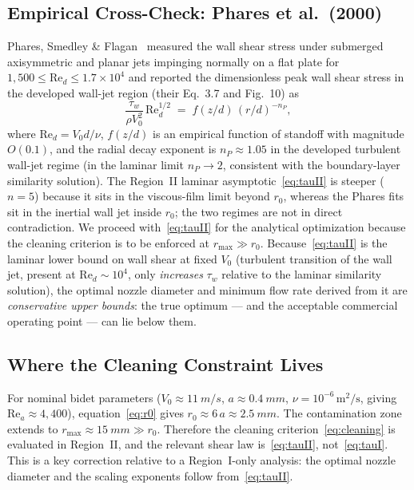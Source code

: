\documentclass[aps,prfluids,reprint,amsmath,amssymb,floatfix]{revtex4-2}
\newcommand{\Rey}{\mathrm{Re}}
\begin{document}
\subsection{Empirical Cross-Check: Phares et al.~(2000)}

Phares, Smedley \& Flagan~\citep{Phares2000} measured the wall shear
stress under submerged axisymmetric and planar jets impinging normally
on a flat plate for $1{,}500 \leq \Rey_d \leq 1.7\times 10^4$
and reported the dimensionless peak wall shear stress in the developed
wall-jet region (their Eq.~3.7 and Fig.~10) as
\begin{equation}
  \frac{\tau_w}{\rho V_0^2}\,\Rey_d^{1/2}
  \;=\; f(z/d)\,(r/d)^{-n_P},
  \label{eq:phares}
\end{equation}
where $\Rey_d = V_0 d/\nu$, $f(z/d)$ is an empirical function
of standoff with magnitude $O(0.1)$, and the radial decay exponent is
$n_P \approx 1.05$ in the developed turbulent wall-jet regime
(in the laminar limit $n_P \to 2$, consistent with the boundary-layer
similarity solution). The Region~II laminar
asymptotic~\eqref{eq:tauII} is steeper ($n = 5$) because it sits in
the viscous-film limit beyond $r_0$, whereas the Phares fits sit
in the inertial wall jet inside $r_0$; the two regimes
are not in direct contradiction. We proceed with~\eqref{eq:tauII} for
the analytical optimization because the cleaning criterion is to be
enforced at $r_\mathrm{max} \gg r_0$. Because~\eqref{eq:tauII} is the
laminar lower bound on wall shear at fixed $V_0$ (turbulent transition
of the wall jet, present at $\Rey_d \sim 10^4$, only \emph{increases}
$\tau_w$ relative to the laminar similarity solution), the optimal
nozzle diameter and minimum flow rate derived from it are
\emph{conservative upper bounds}: the true optimum --- and the
acceptable commercial operating point --- can lie below them.

\subsection{Where the Cleaning Constraint Lives}

For nominal bidet parameters
($V_0 \approx \SI{11}{m/s}$, $a \approx \SI{0.4}{mm}$, $\nu = 10^{-6}\,\mathrm{m^2/s}$,
giving $\Rey_a \approx 4{,}400$), equation~\eqref{eq:r0} gives
$r_0 \approx 6\,a \approx \SI{2.5}{mm}$. The contamination zone extends to
$r_\mathrm{max} \approx \SI{15}{mm} \gg r_0$. Therefore the cleaning
criterion~\eqref{eq:cleaning} is evaluated in Region~II, and the relevant
shear law is~\eqref{eq:tauII}, not~\eqref{eq:tauI}. This is a key
correction relative to a Region~I-only analysis: the optimal nozzle
diameter and the scaling exponents follow from~\eqref{eq:tauII}.
\end{document}
